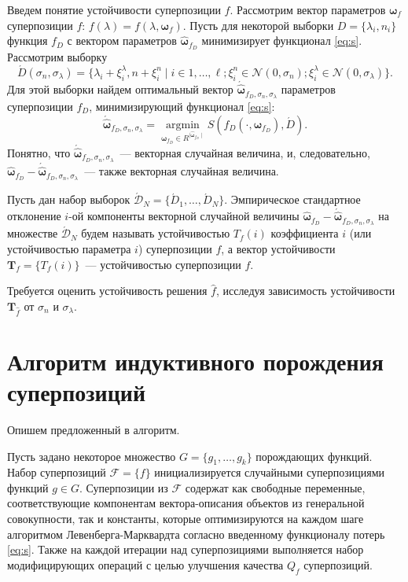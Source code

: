 \documentclass[12pt,a4paper]{article}
\begin{document}
Введем понятие устойчивости суперпозиции $f$. Рассмотрим вектор параметров
$\boldsymbol{\omega}_f$ суперпозиции $f$: $f(\lambda) = f(\lambda, \boldsymbol{\omega}_f)$.
Пусть для некоторой выборки $D = \{ \lambda_i, n_i \}$ функция $f_D$ с
вектором параметров $\hat{\boldsymbol{\omega}}_{f_D}$ минимизирует
функционал \eqref{eq:s}. Рассмотрим выборку
\[
  \acute{D}(\sigma_n, \sigma_{\lambda}) = \{ \lambda_i + \xi^{\lambda}_i, n + \xi^n_i \mid i \in 1, \dots, \ell; \xi^n_i \in \mathcal{N}(0, \sigma_n); \xi^{\lambda}_i \in \mathcal{N}(0, \sigma_{\lambda}) \}.
\]
Для этой выборки найдем оптимальный вектор $\acute{\hat{\boldsymbol{\omega}}}_{f_D, \sigma_n, \sigma_{\lambda}}$
параметров суперпозиции $f_D$, минимизирующий функционал \eqref{eq:s}:
\[
  \acute{\hat{\boldsymbol{\omega}}}_{f_D, \sigma_n, \sigma_{\lambda}} = \mathop{\arg \min}\limits_{\boldsymbol{\omega}_{f_D} \in R^{\mid \hat{\boldsymbol{\omega}}_{f_D} \mid}} S (f_D (\cdot, \boldsymbol{\omega}_{f_D}), \acute{D}).
\]
Понятно, что $\acute{\hat{\boldsymbol{\omega}}}_{f_D, \sigma_n, \sigma_{\lambda}}$~---
векторная случайная величина, и, следовательно,
$\hat{\boldsymbol{\omega}}_{f_D} - \acute{\hat{\boldsymbol{\omega}}}_{f_D, \sigma_n, \sigma_{\lambda}}$~---
также векторная случайная величина.

Пусть дан набор выборок $\acute{\mathcal{D}}_N = \{ \acute{D}_1, \dots, \acute{D}_N \}$. Эмпирическое
стандартное отклонение $i$-ой компоненты векторной случайной величины
$\hat{\boldsymbol{\omega}}_{f_D} - \acute{\hat{\boldsymbol{\omega}}}_{f_D, \sigma_n, \sigma_{\lambda}}$
на множестве $\acute{\mathcal{D}}_N$ будем называть устойчивостью $T_f(i)$ коэффициента $i$
(или устойчивостью параметра $i$) суперпозиции $f$, а вектор устойчивости
$\mathbf{T}_f = \{ T_f(i) \}$~--- устойчивостью суперпозиции $f$.

Требуется оценить устойчивость решения $\hat{f}$, исследуя зависимость
устойчивости $\mathbf{T}_{\hat{f}}$ от $\sigma_n$ и $\sigma_{\lambda}$.

\section{Алгоритм индуктивного порождения суперпозиций}

Опишем предложенный в \cite{Rudoy13} алгоритм.

Пусть задано некоторое множество $G = \{ g_1, \dots, g_k \}$ 
порождающих функций. Набор суперпозиций $\mathcal{F} = \{ f \}$
инициализируется случайными суперпозициями функций $g \in G$. Суперпозиции из
$\mathcal{F}$ содержат как свободные переменные, соответствующие
компонентам вектора-описания объектов из генеральной совокупности, так и
константы, которые оптимизируются на каждом шаге алгоритмом Левенберга-Марквардта
согласно введенному функционалу потерь \eqref{eq:s}. Также на каждой итерации
над суперпозициями выполняется набор модифицирующих операций с целью улучшения
качества $Q_f$ суперпозиций.
\end{document}

